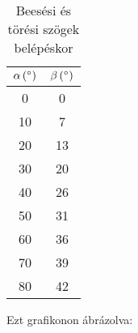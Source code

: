 \documentclass[12pt]{article}
\begin{document}
  
  \begin{table}[H]
    \begin{center}
      \begin{tabular}{|
c|
c|
}
        \hline
        
\ensuremath{\unit[\text{\ensuremath{\alpha}}]{({}^\circ)}} & 
\ensuremath{\unit[\text{\ensuremath{\beta}}]{({}^\circ)}}
\\
        \hline\hline
        
0
 & 0
\\
        \hline
        
10
 & 7
\\
        \hline
        
20
 & 13
\\
        \hline
        
30
 & 20
\\
        \hline
        
40
 & 26
\\
        \hline
        
50
 & 31
\\
        \hline
        
60
 & 36
\\
        \hline
        
70
 & 39
\\
        \hline
        
80
 & 42
\\
        \hline
      \end{tabular}
      \caption{Beesési és törési szögek belépéskor}
      \label{tab:}
    \end{center}
  \end{table}

Ezt grafikonon ábrázolva:
\end{document}
